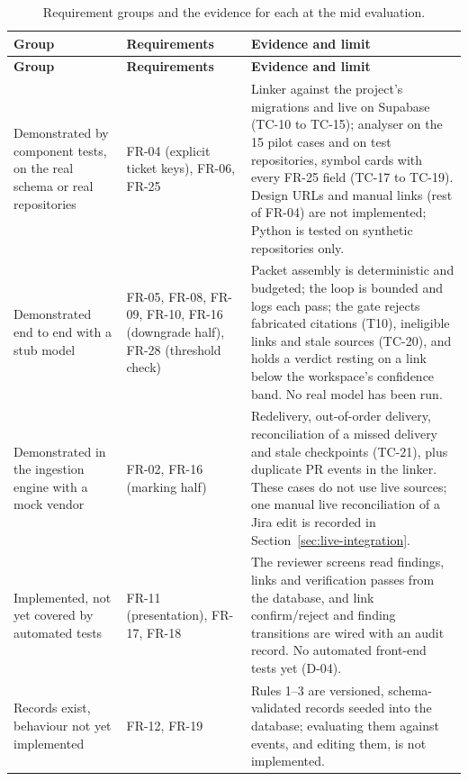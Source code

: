\begin{longtable}{>{\raggedright\arraybackslash}p{} >{\raggedright\arraybackslash}p{} >{\raggedright\arraybackslash}p{}}
\caption{Requirement groups and the evidence for each at the mid evaluation.}\label{tab:acceptance-groups}\\
\hline\textbf{Group} & \textbf{Requirements} & \textbf{Evidence and limit} \\
\hline\endfirsthead
\hline\textbf{Group} & \textbf{Requirements} & \textbf{Evidence and limit} \\
\hline\endhead
Demonstrated by component tests, on the real schema or real repositories
  & FR-04 (explicit ticket keys), FR-06, FR-25
  & Linker against the project's migrations and live on Supabase (TC-10 to
    TC-15); analyser on the 15 pilot cases and on test repositories, symbol
    cards with every FR-25 field (TC-17 to TC-19). Design URLs and manual links
    (rest of FR-04) are not implemented; Python is tested on synthetic
    repositories only. \\
Demonstrated end to end with a stub model
  & FR-05, FR-08, FR-09, FR-10, FR-16 (downgrade half), FR-28 (threshold
    check)
  & Packet assembly is deterministic and budgeted; the loop is bounded and logs
    each pass; the gate rejects fabricated citations (T10), ineligible links
    and stale sources (TC-20), and holds a verdict resting on a link below
    the workspace's confidence band. No real model has been run. \\
Demonstrated in the ingestion engine with a mock vendor
  & FR-02, FR-16 (marking half)
  & Redelivery, out-of-order delivery, reconciliation of a missed delivery and
    stale checkpoints (TC-21), plus duplicate PR events in the linker. These
    cases do not use live sources; one manual live reconciliation of a Jira
    edit is recorded in Section~\ref{sec:live-integration}. \\
Implemented, not yet covered by automated tests
  & FR-11 (presentation), FR-17, FR-18
  & The reviewer screens read findings, links and verification passes from the
    database, and link confirm/reject and finding transitions are wired with
    an audit record. No automated front-end tests yet (D-04). \\
Records exist, behaviour not yet implemented
  & FR-12, FR-19
  & Rules 1--3 are versioned, schema-validated records seeded into the database;
    evaluating them against events, and editing them, is not implemented. \\

\end{longtable}
